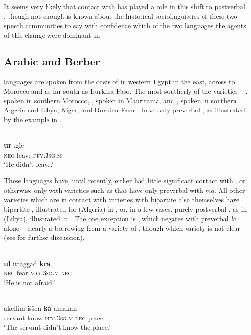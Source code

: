 \documentclass[output=paper]{langsci/langscibook}
\begin{document}
It seems very likely that contact with   has played a role in this shift to postverbal , though not enough is known about the historical sociolinguistics of these two speech communities to say with confidence which of the two languages the agents of this change were dominant in.



\subsection{Arabic and Berber}


 languages are spoken from the oasis of  in western Egypt in the east, across to Morocco and as far south as Burkina Faso. The most southerly of the  varieties – , spoken in southern Morocco, , spoken in Mauritania, and , spoken in southern Algeria and Libya, Niger,  and Burkina Faso – have only preverbal , as illustrated by the  example in .


\ea\label{tua}
{        \citep[10]{Chaker1996}}\\
\gll \textbf{ur} igle\\
     \textsc{neg} leave\textsc{.pfv.3sg.m}\\
\glt ‘He didn’t leave.’
\z

These languages have, until recently, either had little significant contact with , or otherwise only with varieties such as  that have only preverbal  with \textit{mā}. All other  varieties which are in contact with  varieties with bipartite  also themselves have bipartite , illustrated for  (Algeria) in , or, in a few cases, purely postverbal , as in  (Libya), illustrated in . The one exception is , which negates with preverbal \textit{lā} alone – clearly a borrowing from a variety of , though which variety is not clear (see \citealt{Souag2009} for further discussion).

\ea\label{kab}
{        \citep[25]{Rabhi1996}}\\
\gll \textbf{ul} ittaggad \textbf{kra}\\
     \textsc{neg} fear.\textsc{aor.3sg.m} \textsc{neg}\\
\glt ‘He is not afraid.’
\z

\ea\label{awjneg}
{        \citep[82]{Paradisi1961}}\\
\gll akellim iššen-\textbf{ka} amakan \\
     servant know\textsc{.pfv.3sg.m-neg} place\\
\glt ‘The servant didn’t know the place.’
\z
\end{document}
